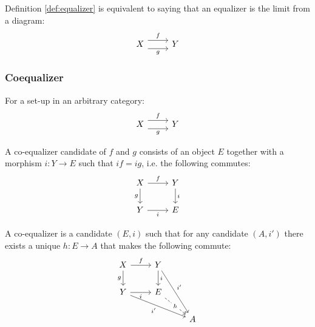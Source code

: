 \begin{definition}
  Definition \ref{def:equalizer} is equivalent to saying that an equalizer is
  the limit from a diagram:
  \[\begin{tikzcd}[ampersand replacement=\&]
    X \& Y
    \arrow["f", shift left=2, from=1-1, to=1-2]
    \arrow["g"', shift right=2, from=1-1, to=1-2]
  \end{tikzcd}\]
\end{definition}

\subsubsection*{Coequalizer}

\begin{definition}
  For a set-up in an arbitrary category:
  \parencite{leinster:basic_category_theory}
  \[\begin{tikzcd}[ampersand replacement=\&]
    X \& Y
    \arrow["f", shift left=2, from=1-1, to=1-2]
    \arrow["g"', shift right=2, from=1-1, to=1-2]
  \end{tikzcd}\]

  A co-equalizer candidate of $f$ and $g$ consists of an object $E$ together
  with a morphism $i:Y\to E$ such that $if = ig$, i.e. the following commutes:
  \[\begin{tikzcd}[ampersand replacement=\&]
    X \& Y \\
    Y \& E
    \arrow["i", from=1-2, to=2-2]
    \arrow["i"', from=2-1, to=2-2]
    \arrow["g"', from=1-1, to=2-1]
    \arrow["f", from=1-1, to=1-2]
  \end{tikzcd}\]

  A co-equalizer is a candidate $(E, i)$ such that for any candidate $(A, i')$
  there exists a unique $h: E\to A$ that makes the following commute:
  \[\begin{tikzcd}[ampersand replacement=\&]
    X \& Y \\
    Y \& E \\
    \&\& A
    \arrow["i", from=1-2, to=2-2]
    \arrow["i"', from=2-1, to=2-2]
    \arrow["g"', from=1-1, to=2-1]
    \arrow["f", from=1-1, to=1-2]
    \arrow["{i'}"', from=2-1, to=3-3]
    \arrow["{i'}", from=1-2, to=3-3]
    \arrow["h"{description}, dashed, from=2-2, to=3-3]
  \end{tikzcd}\]
\end{definition}

\begin{definition}

\end{definition}